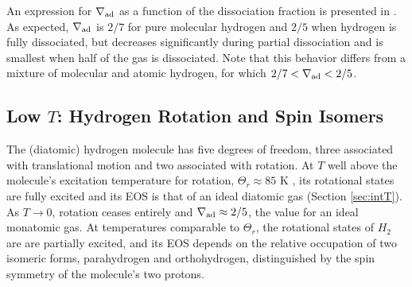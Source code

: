 
An expression for $\nabla_{\rm ad}$ as a function of the dissociation fraction is presented in . As expected,  $\nabla_{\rm ad}$ is $2/7$ for pure molecular hydrogen and $2/5$ when hydrogen is fully dissociated, but decreases significantly during partial dissociation and is smallest when half of the gas is dissociated. Note that this behavior differs from a mixture of molecular and atomic hydrogen, for which $2/7<\nabla_{\rm ad}<2/5$. %







\subsection{Low $T$: Hydrogen Rotation and Spin Isomers}

The (diatomic) hydrogen molecule has five degrees of freedom, three associated with translational motion and two associated with rotation. At $T$ well above the molecule's excitation temperature for rotation, $\Theta_r \approx 85$ K \citep{kittel}, its rotational states are fully excited and its EOS is that of an ideal diatomic gas (Section \ref{sec:intT}).   As $T \rightarrow 0$, rotation  ceases entirely and $\nabla_{\rm ad} \approx 2/5$, the value for an ideal monatomic gas. %
At  temperatures comparable to $\Theta_r$, the rotational states of $H_2$ are  are partially excited, and its EOS depends on the relative occupation of two isomeric forms, parahydrogen and orthohydrogen, distinguished by the spin symmetry of the molecule's two protons.  

